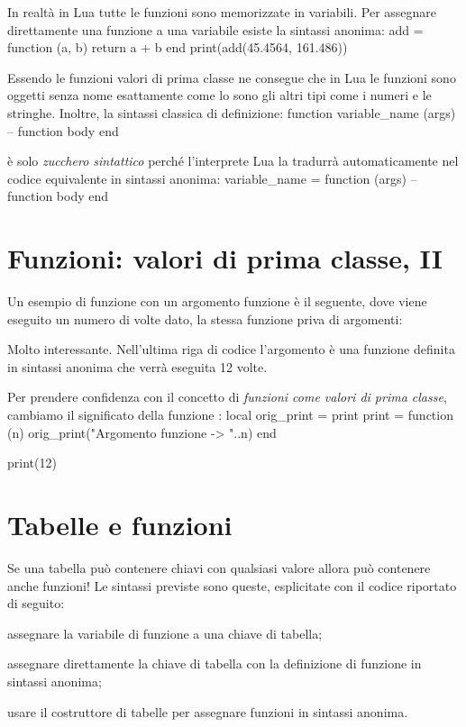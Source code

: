 In realtà in Lua tutte le funzioni sono memorizzate in variabili. Per assegnare
direttamente una funzione a una variabile esiste la sintassi anonima:
\lines
add = function (a, b)
    return a + b
end
print(add(45.4564, 161.486))
\endlines
{}

Essendo le funzioni valori di prima classe ne consegue che in Lua le funzioni
sono oggetti senza nome esattamente come lo sono gli altri tipi come i numeri e
le stringhe. Inoltre, la sintassi classica di definizione:
\lines
function variable_name (args)
    -- function body
end
\endlines
{}

\noindent è solo \emph{zucchero sintattico} perché l'interprete Lua la tradurrà
automaticamente nel codice equivalente in sintassi anonima:
\lines
variable_name = function (args)
    -- function body
end
\endlines
{}


\section{Funzioni: valori di prima classe, II}

Un esempio di funzione con un argomento funzione è il seguente, dove viene
eseguito un numero di volte dato, la stessa funzione priva di argomenti:

Molto interessante. Nell'ultima riga di codice l'argomento è una funzione
definita in sintassi anonima che verrà eseguita 12 volte.

Per prendere confidenza con il concetto di \emph{funzioni come valori di prima
classe}, cambiamo il significato della funzione :
\lines
local orig_print = print
print = function (n)
    orig_print("Argomento funzione -> "..n)
end

print(12)
\endlines
{}


\section{Tabelle e funzioni}

Se una tabella può contenere chiavi con qualsiasi valore allora può contenere
anche funzioni! Le sintassi previste sono queste, esplicitate con il codice
riportato di seguito:
\begin{compactitemize}
\item assegnare la variabile di funzione a una chiave di tabella;
\item assegnare direttamente la chiave di tabella con la definizione di funzione
in sintassi anonima;
\item usare il costruttore di tabelle per assegnare funzioni in sintassi
anonima.
\end{compactitemize}

